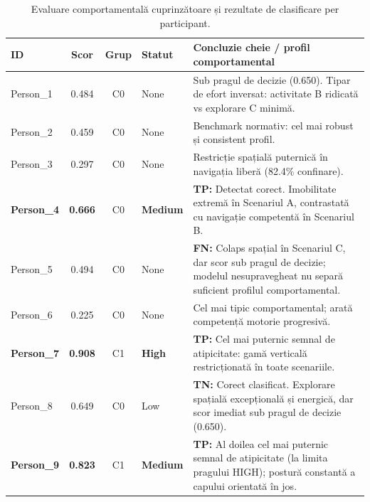 \documentclass[12pt,a4paper]{report}
\theoremstyle{definition}
\theoremstyle{remark}
\begin{document}
\begin{table}[H]
    \centering
    \caption{Evaluare comportamentală cuprinzătoare și rezultate de clasificare per participant.}
    \label{tab:Analiza_participanti}
    \scriptsize
    \begin{tabularx}{\textwidth}{l c c l X}
        \toprule
        \textbf{ID} & \textbf{Scor} & \textbf{Grup} & \textbf{Statut} & \textbf{Concluzie cheie / profil comportamental} \\
        \midrule
        Person\_1 & 0.484 & C0 & None & Sub pragul de decizie (0.650). Tipar de efort inversat: activitate B ridicată vs explorare C minimă. \\

        Person\_2 & 0.459 & C0 & None & Benchmark normativ: cel mai robust și consistent profil. \\

        Person\_3 & 0.297 & C0 & None & Restricție spațială puternică în navigația liberă (82.4\% confinare). \\

        \textbf{Person\_4} & \textbf{0.666} & C0 & \textbf{Medium} & \textbf{TP:} Detectat corect. Imobilitate extremă în Scenariul A, contrastată cu navigație competentă în Scenariul B. \\

        Person\_5 & 0.494 & C0 & None & \textbf{FN:} Colaps spațial în Scenariul C, dar scor sub pragul de decizie; modelul nesupravegheat nu separă suficient profilul comportamental. \\

        Person\_6 & 0.225 & C0 & None & Cel mai tipic comportamental; arată competență motorie progresivă. \\

        \textbf{Person\_7} & \textbf{0.908} & C1 & \textbf{High} & \textbf{TP:} Cel mai puternic semnal de atipicitate: gamă verticală restricționată în toate scenariile. \\

        Person\_8 & 0.649 & C0 & Low & \textbf{TN:} Corect clasificat. Explorare spațială excepțională și energică, dar scor imediat sub pragul de decizie (0.650). \\

        \textbf{Person\_9} & \textbf{0.823} & C1 & \textbf{Medium} & \textbf{TP:} Al doilea cel mai puternic semnal de atipicitate (la limita pragului HIGH); postură constantă a capului orientată în jos. \\


\end{tabularx}
\end{table}
\end{document}
